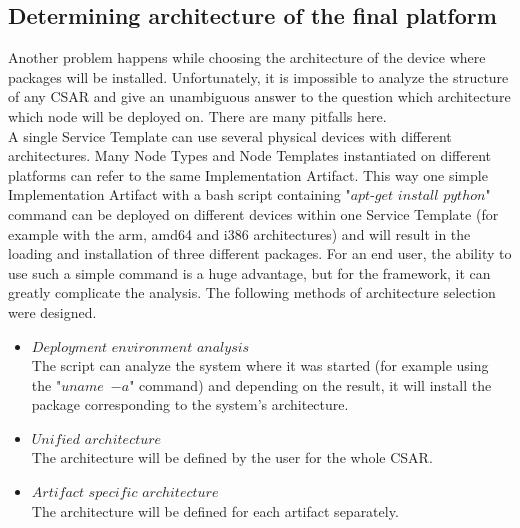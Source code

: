 \subsection{Determining architecture of the final platform} \label{finplatf}
Another problem happens while choosing the architecture of the device where packages will be installed.
Unfortunately, it is impossible to analyze the structure of any CSAR and give an unambiguous answer to the question which architecture which node will be deployed on.
There are many pitfalls here.\\
A single Service Template can use several physical devices with different architectures.
Many Node Types and Node Templates instantiated on different platforms can refer to the same Implementation Artifact.
This way one simple Implementation Artifact with a bash script containing "$apt$-$get$ $install$ $python$" command can be deployed on different devices within one Service Template (for example with the arm, amd64 and i386 architectures) and will result in the loading and installation of three different packages. 
For an end user, the ability to use such a simple command is a huge advantage, but for the framework, it can greatly complicate the analysis.
The following methods of architecture selection were designed.
\begin{itemize}
	\item $Deployment$ $environment$ $analysis$\\
	The script can analyze the system where it was started (for example using the "$uname$~$-a$" command) and depending on the result, it will install the package corresponding to the system's architecture.
	\item $Unified$ $architecture$\\
	The architecture will be defined by the user for the whole CSAR.
	\item $Artifact$ $specific$ $architecture$\\
	The architecture will be defined for each artifact separately.
\end{itemize}
